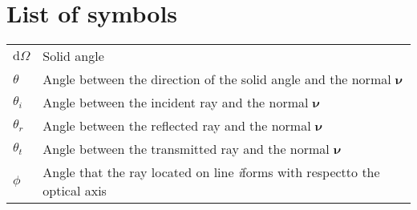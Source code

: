 
\newcommand{\set}[3]{\emph{#1}_{\textit{#2#3}}}
\newcommand{\map}[3]{\mathrm{#1}_{\textit{#2#3}}}
\newcommand{\setbound}[4]{\emph{#1}_{\textit{#2#3}}^{#4}}
\newcommand{\variabile}[1]{\textit{#1}}
\newcommand{\inversemap}[3]{\mathrm{#1}_{\textit{#2#3}}^{-1}}
\newcommand{\vect}[1]{\textit{\textbf{#1}}}
\newcommand{\point}[1]{\textsf{#1}}
\newcommand{\scalar}[2]{(#1 #2)}
\newcommand{\const}[1]{\textrm{#1}}
\newcommand{\myangle}{\theta}
\newcommand{\mytime}{T}
\newcommand{\mynormal}{$\boldsymbol{\nu}$}
\newcommand{\lineai}{\variabile{i}}
\newcommand{\lineaj}{\variabile{j}}
\newcommand{\lineak}{\variabile{k}}
\newcommand{\nline}{\variabile{Nl}}
\newcommand{\n}{\variabile{n}}
\newcommand{\optangle}{\phi}

\chapter*{List of symbols}


\begin{tabular}{l l}

$\textrm{d}{\Omega}$ & {Solid angle}\\
$\myangle$& {Angle between the direction of the solid angle and the normal $\boldsymbol{\nu}$}\\
$\myangle_i$& {Angle between the incident ray and the normal \mynormal}\\
$\myangle_r$ &{Angle between the reflected ray and the normal \mynormal}\\
$\myangle_t$ & {Angle between the transmitted ray and the normal \mynormal}\\
$\optangle$ & {Angle that the ray located on line \lineai forms with respectto the optical axis}\\

\end{tabular}

%